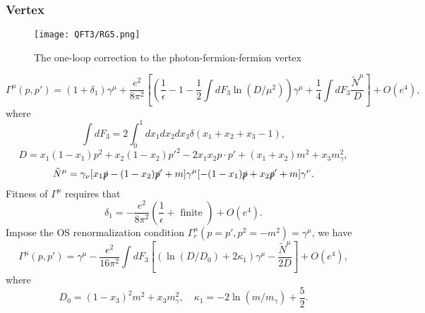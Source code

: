 \subsubsection{Vertex}
\begin{figure}[!h]
\centering
\texttt{[image: QFT3/RG5.png]}
\caption{The one-loop correction to the photon-fermion-fermion vertex}
\end{figure}
\[\Gamma^{\mu}(p,p') = (1+\delta_1)\gamma^{\mu} + \frac{e^2}{8\pi^2} \left[\left(\frac{1}{\epsilon} - 1 - \frac{1}{2} \int dF_3 \ln (D/\mu^2)\right)\gamma^{\mu} + \frac{1}{4} \int dF_3 \frac{\tilde{N}^{\mu}}{D}\right] + O(e^4),\]
where
\[\int dF_3 = 2 \int_0^1 dx_1 dx_2 dx_3 \delta(x_1+x_2+x_3-1),\]
\[D = x_1(1-x_1)p^2 + x_2(1-x_2)p'^2 - 2x_1x_2p \cdot p' + (x_1+x_2)m^2 + x_3 m_{\gamma}^2,\]
\[\tilde{N}^{\mu} = \gamma_{\nu}[x_1\slashed{p}-(1-x_2)\slashed{p}'+m]\gamma^{\mu}[-(1-x_1)\slashed{p}+x_2\slashed{p}'+m]\gamma^{\nu}.\]
Fitness of $\Gamma^{\mu}$ requires that
\[\delta_1 = -  \frac{e^2}{8\pi^2}(\frac{1}{\epsilon}+\mbox{ finite }) + O(e^4).\]
Impose the OS renormalization condition $\Gamma^{\mu}_r(p=p',p^2=-m^2) = \gamma^{\mu}$, we have
\[\Gamma^{\mu}(p,p') = \gamma^{\mu} - \frac{e^2}{16\pi^2} \int dF_3 \left[\left(\ln (D/D_0)+2\kappa_1\right)\gamma^{\mu} - \frac{\tilde{N}^{\mu}}{2D}\right] + O(e^4),\]
where
\[D_0 = (1-x_3)^2m^2 + x_3 m_{\gamma}^2 , \quad \kappa_1 = -2 \ln(m/m_{\gamma}) + \frac{5}{2}.\]

